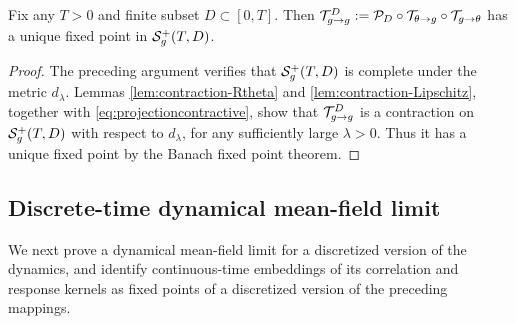 \begin{corollary}\label{cor:continuous-dmft-existunique-with-projection}
Fix any $T>0$ and finite subset $D \subset [0,T]$. Then
$\mathcal{T}_{g \to g}^D:=\mathcal{P}_D \circ \mathcal{T}_{\theta \to g} \circ \mathcal{T}_{g \to \theta}$
has a unique fixed point in $\mathcal{S}_g^+(T,D)$.
\end{corollary}
\begin{proof}
The preceding argument verifies that 
$\mathcal{S}_g^+(T,D)$ is complete under the metric $d_\lambda$. Lemmas
\ref{lem:contraction-Rtheta} and \ref{lem:contraction-Lipschitz}, together with
\eqref{eq:projectioncontractive}, show that
$\mathcal{T}_{g\to g}^D$ is a contraction on $\mathcal{S}_g^+(T,D)$ with respect to $d_\lambda$,
for any sufficiently large $\lambda>0$. Thus it has a unique fixed point by the
Banach fixed point theorem.
\end{proof} 

\subsection{Discrete-time dynamical mean-field limit}

We next prove a dynamical mean-field limit for a discretized version of the
dynamics, and identify continuous-time embeddings of its correlation and response
kernels as fixed points of a discretized version of the preceding mappings.


